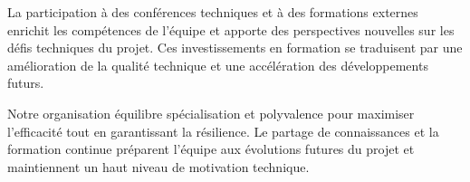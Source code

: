 La participation à des conférences techniques et à des formations externes enrichit les compétences de l'équipe et apporte des perspectives nouvelles sur les défis techniques du projet. Ces investissements en formation se traduisent par une amélioration de la qualité technique et une accélération des développements futurs.

\begin{successbox}
Notre organisation équilibre spécialisation et polyvalence pour maximiser l'efficacité tout en garantissant la résilience. Le partage de connaissances et la formation continue préparent l'équipe aux évolutions futures du projet et maintiennent un haut niveau de motivation technique.
\end{successbox}